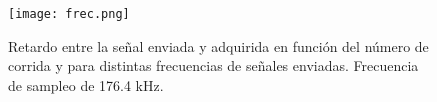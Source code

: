 \documentclass[a4paper, 11pt]{article}
\begin{document}
\begin{figure} [H]
\centering
\texttt{[image: frec.png]}
\caption{Retardo entre la señal enviada y adquirida en función del número de corrida y para distintas frecuencias de señales enviadas. Frecuencia de sampleo de 176.4 kHz.  \label{fig:frec}}
\end{figure} 







%
\end{document}
